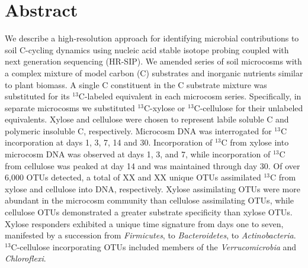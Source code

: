 \section{Abstract}
We describe a high-resolution approach for identifying microbial contributions
to soil C-cycling dynamics using nucleic acid stable isotope probing coupled
with next generation sequencing (HR-SIP). We amended series of soil microcosms
with a complex mixture of model carbon (C) substrates and inorganic nutrients
similar to plant biomass. A single C constituent in the C substrate mixture was
substituted for its $^{13}$C-labeled equivalent in each microcosm series.
Specifically, in separate microcosms we substituted $^{13}$C-xylose or
$^{13}$C-cellulose for their unlabeled equivalents. Xylose and cellulose were
chosen to represent labile soluble C and polymeric insoluble C, respectively.
Microcosm DNA was interrogated for $^{13}$C incorporation at days 1, 3, 7, 14 and 
30. Incorporation of $^{13}$C from xylose into microcosm DNA
was observed at days 1, 3, and 7, while incorporation of $^{13}$C from
cellulose was peaked at day 14 and was maintained through day 30. Of over 6,000
OTUs detected, a total of XX and XX unique OTUs assimilated $^{13}$C from
xylose and cellulose into DNA, respectively. Xylose assimilating OTUs were more
abundant in the microcosm community than cellulose assimilating OTUs, while
cellulose OTUs demonstrated a greater substrate specificity than xylose OTUs. Xylose responders exhibited a unique time signature from days one to seven, manifested by a succession from \textit{Firmicutes}, to \textit{Bacteroidetes}, to \textit{Actinobacteria}. $^{13}$C-cellulose
incorporating OTUs included members of the \textit{Verrucomicrobia} and
\textit{Chloroflexi}.  

